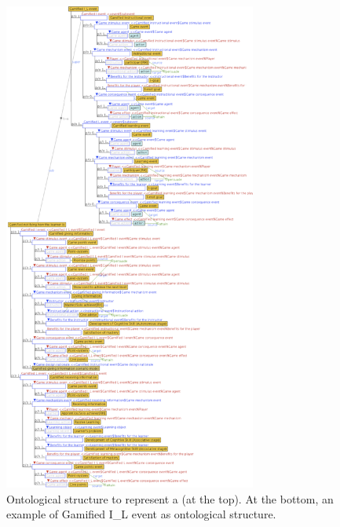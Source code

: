 \begin{figure}[!htbp]
 \caption[Ontological structure to represent a \emph{Gamified I\_L event}]{Ontological structure to represent a  (at the top). At the bottom, an example of Gamified I\_L event  as ontological structure.}
 \label{fig:ontological-structure-gamified-il-event}
 \centering
 \includegraphics[width=0.74\textwidth]{images/chap-ontogacles2/ontological-structure-gamified-il-event.png}
 \fautor
\end{figure}
\newpage

